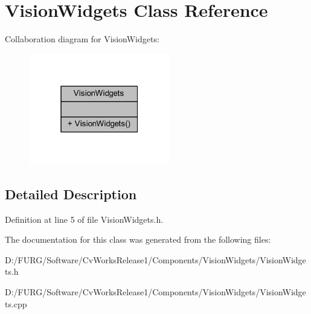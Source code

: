 \hypertarget{class_vision_widgets}{}\section{Vision\+Widgets Class Reference}
\label{class_vision_widgets}


Collaboration diagram for Vision\+Widgets\+:
\nopagebreak
\begin{figure}[H]
\begin{center}
\leavevmode
\includegraphics[width=175pt]{class_vision_widgets__coll__graph}
\end{center}
\end{figure}


\subsection{Detailed Description}


Definition at line 5 of file Vision\+Widgets.\+h.



The documentation for this class was generated from the following files\+:\begin{DoxyCompactItemize}
\item 
D\+:/\+F\+U\+R\+G/\+Software/\+Cv\+Works\+Release1/\+Components/\+Vision\+Widgets/Vision\+Widgets.\+h\item 
D\+:/\+F\+U\+R\+G/\+Software/\+Cv\+Works\+Release1/\+Components/\+Vision\+Widgets/Vision\+Widgets.\+cpp\end{DoxyCompactItemize}

